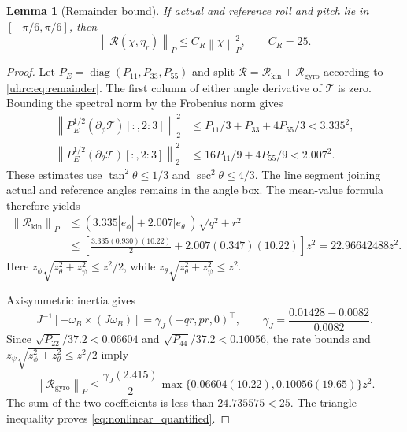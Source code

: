 \documentclass[12pt, a4paper]{article}
\newtheorem{lemma}{Lemma}
\begin{document}
\begin{lemma}[Remainder bound]
\label{uhrc:lem:remainder}
If actual and reference roll and pitch lie in $[-\pi/6,\pi/6]$, then
\begin{equation}
 \left\lVert \mathcal R(\chi,\eta_r)\right\rVert_{P}
 \le C_R\left\lVert \chi\right\rVert_{P}^2,\qquad C_R=25.
 \label{eq:nonlinear_quantified}
\end{equation}
\end{lemma}
\begin{proof}
Let $P_E=\operatorname{diag}(P_{11},P_{33},P_{55})$ and split
$\mathcal R=\mathcal R_{\mathrm{kin}}+\mathcal R_{\mathrm{gyro}}$
according to \eqref{uhrc:eq:remainder}. The first column of either angle
derivative of $\mathcal T$ is zero. Bounding the spectral norm by the
Frobenius norm gives
\begin{align}
 \left\lVert P_E^{1/2}(\partial_\phi\mathcal T)[:,2{:}3]\right\rVert_{2}^2
 &\le P_{11}/3+P_{33}+4P_{55}/3<3.335^2,\nonumber\\
 \left\lVert P_E^{1/2}(\partial_\theta\mathcal T)[:,2{:}3]\right\rVert_{2}^2
 &\le16P_{11}/9+4P_{55}/9<2.007^2.
 \label{uhrc:eq:T-derivatives}
\end{align}
These estimates use $\tan^2\theta\le1/3$ and $\sec^2\theta\le4/3$.
The line segment joining actual and reference angles remains in the angle
box. The mean-value formula therefore yields
\begin{align}
 \left\lVert \mathcal R_{\mathrm{kin}}\right\rVert_{P}
 &\le(3.335|e_\phi|+2.007|e_\theta|)\sqrt{q^2+r^2}\nonumber\\
 &\le\left[\frac{3.335(0.930)(10.22)}2+
                 2.007(0.347)(10.22)\right]z^2
 =22.96642488z^2.
 \label{uhrc:eq:kinematic-bound}
\end{align}
Here $z_\phi\sqrt{z_\theta^2+z_\psi^2}\le z^2/2$, while
$z_\theta\sqrt{z_\theta^2+z_\psi^2}\le z^2$.

Axisymmetric inertia gives
\begin{equation}
 J^{-1}[-\omega_B\times(J\omega_B)]
 =\gamma_J(-qr,pr,0)^\top,\qquad
 \gamma_J=\frac{0.01428-0.0082}{0.0082}.
 \label{uhrc:eq:gyro}
\end{equation}
Since $\sqrt{P_{22}}/37.2<0.06604$ and
$\sqrt{P_{44}}/37.2<0.10056$, the rate bounds and
$z_\psi\sqrt{z_\phi^2+z_\theta^2}\le z^2/2$ imply
\begin{equation}
 \left\lVert \mathcal R_{\mathrm{gyro}}\right\rVert_{P}
 \le\frac{\gamma_J(2.415)}2
 \max\{0.06604(10.22),0.10056(19.65)\}z^2.
 \label{uhrc:eq:gyro-bound}
\end{equation}
The sum of the two coefficients is less than $24.735575<25$.
The triangle inequality proves \eqref{eq:nonlinear_quantified}.
\end{proof}
\end{document}
